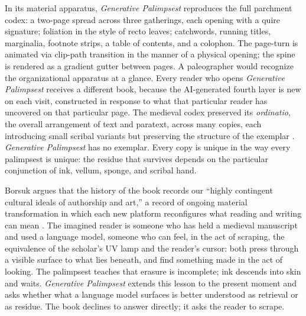 \documentclass[12pt]{article}
\begin{document}
In its material apparatus, \textit{Generative Palimpsest} reproduces the full
parchment codex: a two-page spread across three gatherings, each opening with a
quire signature; foliation in the style of recto leaves; catchwords, running
titles, marginalia, footnote strips, a table of contents, and a colophon. The
page-turn is animated via clip-path transition in the manner of a physical
opening; the spine is rendered as a gradient gutter between pages. A
paleographer would recognize the organizational apparatus at a glance. Every
reader who opens \textit{Generative Palimpsest} receives a different book, because the AI-generated fourth layer is new on each
visit, constructed in response to what that particular reader has uncovered on
that particular page. The medieval codex preserved its \textit{ordinatio}, the
overall arrangement of text and paratext, across many copies, each introducing
small scribal variants but preserving the structure of the exemplar
\parencite{parkes1991}. \textit{Generative Palimpsest} has no exemplar. Every
copy is unique in the way every palimpsest is unique: the residue that survives
depends on the particular conjunction of ink, vellum, sponge, and scribal hand.

Borsuk argues that the history of the book records our ``highly contingent
cultural ideals of authorship and art,'' a record of ongoing material
transformation in which each new platform reconfigures what reading and writing
can mean \parencite{borsuk2018}. The imagined reader is someone who has held a medieval manuscript and
used a language model, someone who can feel, in the act of scraping, the
equivalence of the scholar's UV lamp and the reader's cursor: both press
through a visible surface to what lies beneath, and find something made in
the act of looking. The palimpsest teaches that erasure is incomplete; ink descends into skin and
waits. \textit{Generative
  Palimpsest} extends this lesson to the present moment and asks whether what a
language model surfaces is better understood as retrieval or as residue. The
book declines to answer directly; it asks the reader to scrape.

\nocite{netz2007,parkes1991,reynolds1991,borsuk2018,hayles2002,drucker2008,rouse2000,carson2010}

\newpage
\printbibliography[title={Works Cited}]
\end{document}
